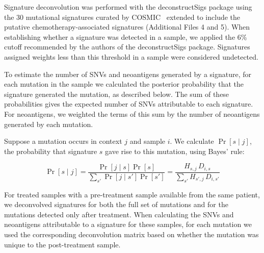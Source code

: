 Signature deconvolution was performed with the deconstructSigs\cite{Rosenthal_2016} package using the 30 mutational signatures curated by COSMIC~\cite{364242} extended to include the putative chemotherapy-associated signatures (Additional Files 4 and 5). When establishing whether a signature was detected in a sample, we applied the 6\% cutoff recommended by the authors of the deconstructSigs package. Signatures assigned weights less than this threshold in a sample were considered undetected.


To estimate the number of SNVs and neoantigens generated by a signature, for each mutation in the sample we calculated the posterior probability that the signature generated the mutation, as described below. The sum of these probabilities gives the expected number of SNVs attributable to each signature. For neoantigens, we weighted the terms of this sum by the number of neoantigens generated by each mutation.

Suppose a mutation occurs in context $j$ and sample $i$. We calculate $\Pr[s \mid j]$, the probability that signature $s$ gave rise to this mutation, using Bayes' rule:

\[
\Pr[s \mid j] = \frac{\Pr[j \mid s] \Pr[s]}{\sum_{s'}{\Pr[j \mid s']\Pr[s']}} = \frac{H_{s,j} \, D_{i,s}}{\sum_{s'}{H_{s',j} \, D_{i,s'}}}
\]

For treated samples with a pre-treatment sample available from the same patient, we deconvolved signatures for both the full set of mutations and for the mutations detected only after treatment. When calculating the SNVs and neoantigens attributable to a signature for these samples, for each mutation we used the corresponding deconvolution matrix based on whether the mutation was unique to the post-treatment sample.

